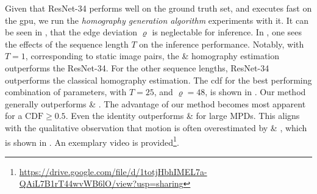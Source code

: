 Given that ResNet-34 performs well on the ground truth set, and executes fast on the \gls{gpu}, we run the \textit{homography generation algorithm} experiments with it. It can be seen in , that the edge deviation $\varrho$ is neglectable for inference. In , one sees the effects of the sequence length $T$ on the inference performance. Notably, with $T=1$, corresponding to static image pairs, the  \&  homography estimation outperforms the ResNet-34. For the other sequence lengths, ResNet-34 outperforms the classical homography estimation. The \gls{cdf} for the best performing combination of parameters, with $T=25$, and $\varrho=48$, is shown in . Our method generally outperforms  \& . The advantage of our method becomes most apparent for a $\text{CDF}\geq0.5$. Even the identity outperforms  \&  for large MPDs. This aligns with the qualitative observation that motion is often overestimated by  \& , which is shown in . An exemplary video is provided\footnote{\url{https://drive.google.com/file/d/1totjHbhIMEL7a-QAiL7B1rT44wvWB6lO/view?usp=sharing}}.






